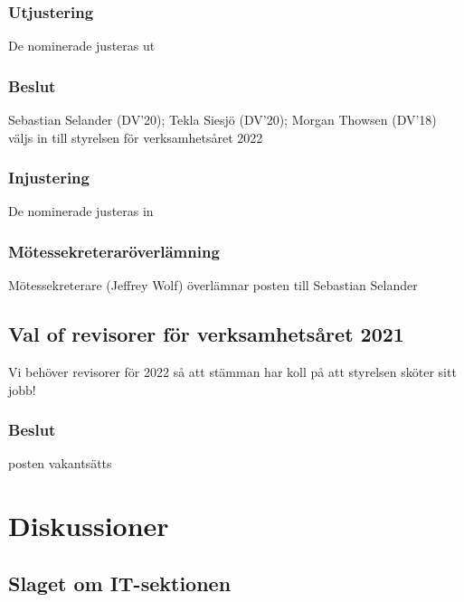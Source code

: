 \documentclass[protokoll]{dvd}
\begin{document}
        \subsubsection*{Utjustering}
        De nominerade justeras ut

        \subsubsection*{Beslut}
        \begin{attsatser}
            \item Sebastian Selander (DV'20); Tekla Siesjö (DV'20); Morgan Thowsen (DV'18) väljs in till styrelsen för verksamhetsåret 2022
        \end{attsatser}

        \subsubsection*{Injustering}
        De nominerade justeras in

        \subsubsection*{Mötessekreteraröverlämning}
        Mötessekreterare (Jeffrey Wolf) överlämnar posten till Sebastian Selander

\newpage

\subsection{Val of revisorer för verksamhetsåret 2021}
Vi behöver revisorer för 2022 så att stämman har koll på att styrelsen sköter sitt jobb!

        \subsubsection*{Beslut}
            \begin{attsatser}
                \item posten vakantsätts
            \end{attsatser}

\newpage

\section{Diskussioner}\label{sec:discussioner}

\subsection{Slaget om IT-sektionen}
\end{document}
